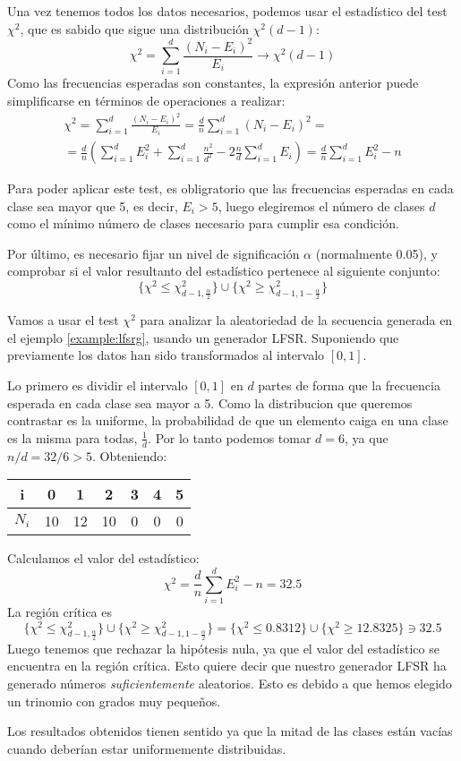 Una vez tenemos todos los datos necesarios, podemos usar el estadístico del test $\chi^2$, que es sabido que sigue una distribución $\chi^2(d-1)$:
\[
\chi^2=\sum_{i=1}^d\frac{(N_i-E_i)^2}{E_i} \longrightarrow \chi^2(d-1)
\]
Como las frecuencias esperadas son constantes, la expresión anterior puede simplificarse en términos de operaciones a realizar:
\begin{multline}
\chi^2=\sum_{i=1}^d\frac{(N_i-E_i)^2}{E_i}=\frac{d}{n}\sum_{i=1}^d(N_i-E_i)^2= \\
=\frac{d}{n}\left(\sum_{i=1}^dE_i^2+\sum_{i=1}^d\frac{n^2}{d^2}-2\frac{n}{d}\sum_{i=1}^dE_i\right)=\frac{d}{n}\sum_{i=1}^dE_i^2-n
\end{multline}

Para poder aplicar este test, es obligratorio que las frecuencias esperadas en cada clase sea mayor que 5, es decir, $E_i>5$, luego elegiremos el número de clases $d$ como el mínimo número de clases necesario para cumplir esa condición.

Por último, es necesario fijar un nivel de significación $\alpha$ (normalmente  0.05), y comprobar si el valor resultanto del estadístico pertenece al siguiente conjunto:
\[
\{\chi^2\leq \chi^2_{d-1,\frac{\alpha}{2}}\}\cup\{\chi^2\geq \chi^2_{d-1,1-\frac{\alpha}{2}}\}
\]

\begin{example}
Vamos a usar el test $\chi^2$ para analizar la aleatoriedad de la secuencia generada en el ejemplo \ref{example:lfsrg}, usando un generador LFSR. Suponiendo que previamente los datos han sido transformados al intervalo $[0,1]$.

Lo primero es dividir el intervalo $[0,1]$ en $d$ partes de forma que la frecuencia esperada en cada clase sea mayor a 5. Como la distribucion que queremos contrastar es la uniforme, la probabilidad de que un elemento caiga en una clase es la misma para todas, $\frac{1}{d}$. Por lo tanto podemos tomar $d=6$, ya que $n/d=32/6>5$. Obteniendo:

\begin{center}
\begin{tabular}{c|cccccc}
i & 0 & 1 & 2 & 3 & 4 & 5 \\ 
\hline 
$N_i$ & 10 & 12 & 10 & 0 & 0 & 0 \\ 
\end{tabular} 
\end{center}
Calculamos el valor del estadístico:
\[
\chi^2=\frac{d}{n}\sum_{i=1}^dE_i^2-n=32.5
\]
La región crítica es 
\[
\{\chi^2\leq \chi^2_{d-1,\frac{\alpha}{2}}\}\cup\{\chi^2\geq \chi^2_{d-1,1-\frac{\alpha}{2}}\}=
\{\chi^2\leq 0.8312 \}\cup\{\chi^2\geq 12.8325 \}\ni 32.5
\]
Luego tenemos que rechazar la hipótesis nula, ya que el valor del estadístico se encuentra en la región crítica. Esto quiere decir que nuestro generador LFSR ha generado números \textit{suficientemente} aleatorios. Esto es debido a que hemos elegido un trinomio con grados muy pequeños.

Los resultados obtenidos tienen sentido ya que la mitad de las clases están vacías cuando deberían estar uniformemente distribuidas.

\end{example}

